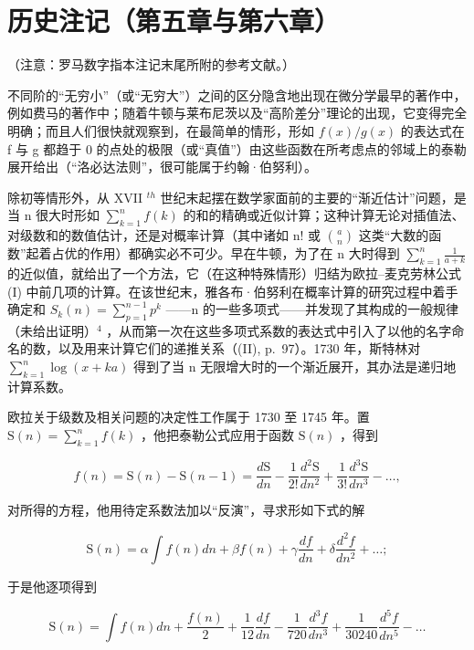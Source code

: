 \section*{历史注记（第五章与第六章）}
{}

（注意：罗马数字指本注记末尾所附的参考文献。）

不同阶的“无穷小”（或“无穷大”）之间的区分隐含地出现在微分学最早的著作中，例如费马的著作中；随着牛顿与莱布尼茨以及“高阶差分”理论的出现，它变得完全明确；而且人们很快就观察到，在最简单的情形，形如 \(f(x)/g(x)\) 的表达式在 f 与 g 都趋于 0 的点处的极限（或“真值”）由这些函数在所考虑点的邻域上的泰勒展开给出（“洛必达法则”，很可能属于约翰·伯努利）。

除初等情形外，从 XVII \(^{th}\) 世纪末起摆在数学家面前的主要的“渐近估计”问题，是当 n 很大时形如 \(\sum_{k=1}^{n} f(k)\) 的和的精确或近似计算；这种计算无论对插值法、对级数和的数值估计，还是对概率计算（其中诸如 n! 或 \(\binom{a}{n}\) 这类“大数的函数”起着占优的作用）都确实必不可少。早在牛顿，为了在 n 大时得到 \(\sum_{k=1}^{n} \frac{1}{a+k}\) 的近似值，就给出了一个方法，它（在这种特殊情形）归结为欧拉–麦克劳林公式 (I) 中前几项的计算。在该世纪末，雅各布·伯努利在概率计算的研究过程中着手确定和 \(S_{k}(n) = \sum_{p=1}^{n-1} p^{k}\) ——n 的一些多项式——并发现了其构成的一般规律（未给出证明）\(^{4}\) ，从而第一次在这些多项式系数的表达式中引入了以他的名字命名的数，以及用来计算它们的递推关系（(II), p.~97）。1730 年，斯特林对 \(\sum_{k=1}^{n} \log(x + ka)\) 得到了当 n 无限增大时的一个渐近展开，其办法是递归地计算系数。

欧拉关于级数及相关问题的决定性工作属于 1730 至 1745 年。置 \(\mathrm{S}(n) = \sum_{k=1}^{n} f(k)\) ，他把泰勒公式应用于函数 \(\mathrm{S}(n)\) ，得到

\[
f (n) = \mathrm{S} (n) - \mathrm{S} (n - 1) = \frac {d \mathrm{S}}{d n} - \frac {1}{2 !} \frac {d ^ {2} \mathrm{S}}{d n ^ {2}} + \frac {1}{3 !} \frac {d ^ {3} \mathrm{S}}{d n ^ {3}} - \dots ,
\]

对所得的方程，他用待定系数法加以“反演”，寻求形如下式的解

\[
\mathrm{S} (n) = \alpha \int f (n) d n + \beta f (n) + \gamma \frac {d f}{d n} + \delta \frac {d ^ {2} f}{d n ^ {2}} + \dots ;
\]

于是他逐项得到

\[
\mathrm{S} (n) = \int f (n) d n + \frac {f (n)}{2} + \frac {1}{1 2} \frac {d f}{d n} - \frac {1}{7 2 0} \frac {d ^ {3} f}{d n ^ {3}} + \frac {1}{3 0 2 4 0} \frac {d ^ {5} f}{d n ^ {5}} - \dots
\]

